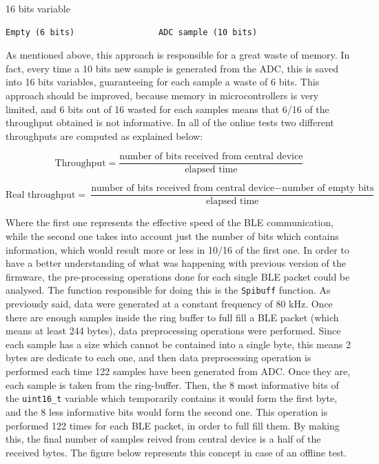 \documentclass{Configuration_Files/PoliMi3i_thesis}
\begin{document}
\begin{center}
16 bits variable
\end{center}

\begin{verbatim}
Empty (6 bits)                 ADC sample (10 bits)
\end{verbatim}

As mentioned above, this approach is responsible for a great waste of memory. In fact, every time a 10 bits new sample is generated from the ADC, this is saved into 16 bits variables, guaranteeing for each sample a waste of 6 bits. This approach should be improved, because memory in microcontrollers is very limited, and 6 bits out of 16 wasted for each samples means that 6/16 of the throughput obtained is not informative. In all of the online tests two different throughputs are computed as explained below:

\[
\text{Throughput} = \frac{\text{number of bits received from central device}}{\text{elapsed time}}
\]

\[
\text{Real throughput} = \frac{\text{number of bits received from central device} - \text{number of empty bits}}{\text{elapsed time}}
\]

Where the first one represents the effective speed of the BLE communication, while the second one takes into account just the number of bits which contains information, which would result more or less in 10/16 of the first one. In order to have a better understanding of what was happening with previous version of the firmware, the pre-processing operations done for each single BLE packet could be analysed. The function responsible for doing this is the \texttt{Spibuff} function. As previously said, data were generated at a constant frequency of 80 kHz. Once there are enough samples inside the ring buffer to full fill a BLE packet (which means at least 244 bytes), data preprocessing operations were performed. Since each sample has a size which cannot be contained into a single byte, this means 2 bytes are dedicate to each one, and then data preprocessing operation is performed each time 122 samples have been generated from ADC. Once they are, each sample is taken from the ring-buffer. Then, the 8 most informative bits of the \texttt{uint16\_t} variable which temporarily contains it would form the first byte, and the 8 less informative bits would form the second one. This operation is performed 122 times for each BLE packet, in order to full fill them. By making this, the final number of samples reived from central device is a half of the received bytes. The figure below represents this concept in case of an offline test.
\end{document}
